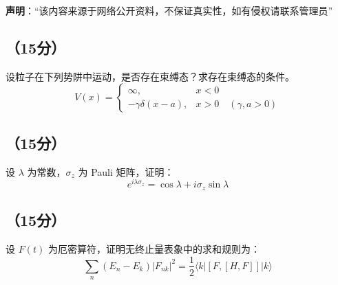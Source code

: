 
\textbf{声明}：“该内容来源于网络公开资料，不保证真实性，如有侵权请联系管理员”

\subsection{（15分）}
设粒子在下列势阱中运动，是否存在束缚态？求存在束缚态的条件。
\[
V(x) =
\begin{cases}
\infty, & x < 0 \\
-\gamma \delta(x - a), & x > 0 \quad (\gamma, a > 0)
\end{cases}~
\]

\subsection{（15分）}
设 $\lambda$ 为常数，$\sigma_z$ 为 Pauli 矩阵，证明：
    \[
    e^{i \lambda \sigma_z} = \cos \lambda + i \sigma_z \sin \lambda~
    \]

\subsection{（15分）}
设 $F(t)$ 为厄密算符，证明无终止量表象中的求和规则为：
    \[
    \sum_n (E_n - E_k) |F_{nk}|^2 = \frac{1}{2} \langle k | [F, [H, F]] | k \rangle~
    \]